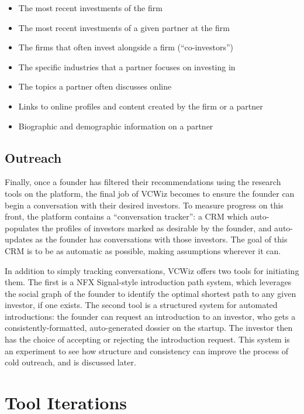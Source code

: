 \begin{itemize}
  \item The most recent investments of the firm
  \item The most recent investments of a given partner at the firm
  \item The firms that often invest alongside a firm (``co-investors'')
  \item The specific industries that a partner focuses on investing in
  \item The topics a partner often discusses online
  \item Links to online profiles and content created by the firm or a partner
  \item Biographic and demographic information on a partner
\end{itemize}

\subsection{Outreach}

Finally, once a founder has filtered their recommendations using the research tools on the platform, the final job of VCWiz becomes to ensure the founder can begin a conversation with their desired investors. To measure progress on this front, the platform contains a ``conversation tracker'': a CRM which auto-populates the profiles of investors marked as desirable by the founder, and auto-updates as the founder has conversations with those investors. The goal of this CRM is to be as automatic as possible, making assumptions wherever it can.

In addition to simply tracking conversations, VCWiz offers two tools for initiating them. The first is a NFX Signal-style introduction path system, which leverages the social graph of the founder to identify the optimal shortest path to any given investor, if one exists. The second tool is a structured system for automated introductions: the founder can request an introduction to an investor, who gets a consistently-formatted, auto-generated dossier on the startup. The investor then has the choice of accepting or rejecting the introduction request. This system is an experiment to see how structure and consistency can improve the process of cold outreach, and is discussed later.

\section{Tool Iterations}

